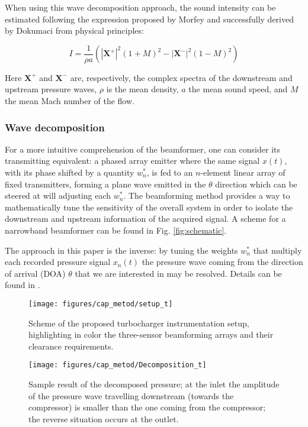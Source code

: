 When using this wave decomposition approach, the sound intensity can be estimated following the expression proposed by Morfey \cite{morfey1971sound} and successfully derived by Dokumaci \cite{dokumaci2000calculation} from physical principles:

\begin{equation}\label{eq:intensity}
    I=\frac{1}{\rho a}\left(|\mathbf X^+ |^2(1+M)^2-|\mathbf X^- |^2(1-M)^2\right)
\end{equation}

Here $\mathbf X^+$ and $\mathbf X^-$ are, respectively, the complex spectra of the downstream and upstream pressure waves, $\rho$ is the mean density, $a$ the mean sound speed, and $M$ the mean Mach number of the flow.


\subsubsection{Wave decomposition}
For a more intuitive comprehension of the beamformer, one can consider its transmitting equivalent: a phased array emitter where the same signal $x(t)$, with its phase shifted by a quantity $w_n^*$, is fed to an $n$-element linear array of fixed transmitters, forming a plane wave emitted in the $\theta$ direction which can be steered at will adjusting each $w_n^*$.
The beamforming method provides a way to mathematically tune the sensitivity of the overall system in order to isolate the downstream and upstream information of the acquired signal. A scheme for a narrowband beamformer can be found in Fig. \ref{fig:schematic}.

The approach in this paper is the inverse: by tuning the weights $w_n^*$ that multiply each recorded pressure signal $x_n(t)$ the pressure wave coming from the direction of arrival (DOA) $\theta$ that we are interested in may be resolved. Details can be found in \cite{van1988beamforming}.

\begin{figure}[b!]
\centering
\texttt{[image: figures/cap\_metod/setup\_t]}
\caption{Scheme of the proposed turbocharger instrumentation setup, highlighting in color the three-sensor beamforming arrays and their clearance requirements.}
\label{fig:setup}
\end{figure}

\begin{figure*}[t!]
\centering
\texttt{[image: figures/cap\_metod/Decomposition\_t]}
\caption{Sample result of the decomposed pressure; at the inlet the amplitude of the pressure wave travelling downstream (towards the compressor) is smaller than the one coming from the compressor; the reverse situation occurs at the outlet.}
\label{fig:decomposition}
\end{figure*}

